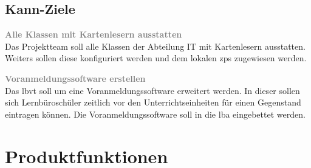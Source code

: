 \subsection{Kann-Ziele}
\begin{coloritemize}
    \item \textbf{\textcolor{gray}{Alle Klassen mit Kartenlesern ausstatten}}  \\
        Das Projektteam soll alle Klassen der Abteilung IT mit Kartenlesern ausstatten. Weiters sollen diese konfiguriert werden und dem lokalen \gls{zps} zugewiesen werden.
        
    \item \textbf{\textcolor{gray}{Voranmeldungssoftware erstellen}}  \\    
        Das \gls{lbvt} soll um eine Voranmeldungssoftware erweitert werden. In dieser sollen sich Lernbüroschüler zeitlich vor den Unterrichtseinheiten für einen Gegenstand eintragen können. Die Voranmeldungssoftware soll in die \gls{lba} eingebettet werden.  
\end{coloritemize}

\newpage
\section{Produktfunktionen}
